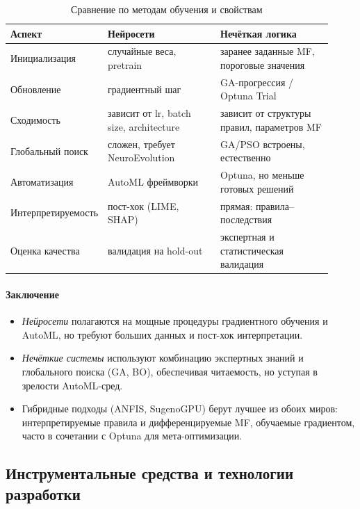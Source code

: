\begin{table}[H]
\centering\small
\caption{Сравнение по методам обучения и свойствам}
\label{tab:nn_fuzzy_training}
\begin{tabular}{@{}p{0.20\linewidth}p{0.36\linewidth}p{0.36\linewidth}@{}}
\toprule
\textbf{Аспект} & \textbf{Нейросети} & \textbf{Нечёткая логика} \\ \midrule
Инициализация & случайные веса, pretrain & заранее заданные MF, пороговые значения \\[4pt]
Обновление & градиентный шаг & GA-прогрессия / Optuna Trial \\[4pt]
Сходимость & зависит от lr, batch size, architecture & зависит от структуры правил, параметров MF \\[4pt]
Глобальный поиск & сложен, требует NeuroEvolution & GA/PSO встроены, естественно \\[4pt]
Автоматизация & AutoML фреймворки & Optuna, но меньше готовых решений \\[4pt]
Интерпретируемость  & пост-хок (LIME, SHAP) & прямая: правила–последствия \\[4pt]
Оценка качества & валидация на hold-out & экспертная и статистическая валидация \\ 
\bottomrule
\end{tabular}
\end{table}

\paragraph{Заключение}
\begin{itemize}
  \item \emph{Нейросети} полагаются на мощные процедуры градиентного обучения и AutoML, но требуют больших данных и пост-хок интерпретации.
  \item \emph{Нечёткие системы} используют комбинацию экспертных знаний и глобального поиска (GA, BO), обеспечивая читаемость, но уступая в зрелости AutoML-сред.
  \item Гибридные подходы (ANFIS, SugenoGPU) берут лучшее из обоих миров: интерпретируемые правила и дифференцируемые MF, обучаемые градиентом, часто в сочетании с Optuna для мета-оптимизации.
\end{itemize}

\subsection{Инструментальные средства и технологии разработки}
\label{subsec:tools}


